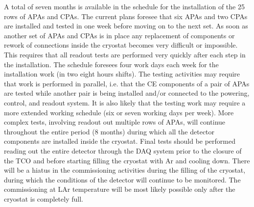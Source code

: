 A total of seven months is available in the schedule for the installation
of the 25 rows of APAs and CPAs. The current plans foresee that six APAs and two CPAs are installed and
tested in one week before moving on to the next set. As soon as another
set of APAs and CPAs is in place any replacement of components or rework
of connections inside the cryostat becomes very difficult or impossible.
This requires that all readout tests are performed very quickly after
each step in the installation. The schedule foresees four work days each
week for the installation work (in two eight hours shifts). The testing
activities may require that work is performed in parallel, i.e. that
the CE components of a pair of APAs are tested while another pair is
being installed and/or connected to the powering, control, and readout
system. It is also likely that the testing work may require a more
extended working schedule (six or seven working days per week). More
complex tests, involving readout out multiple rows of APAs, will continue
throughout the entire period (8 months) during which all the detector
components are installed inside the cryostat. Final tests should be
performed reading out the entire detector through the DAQ system
prior to the closure of the TCO and before starting filling the cryostat
with Ar and cooling down. There will be a hiatus in
the commissioning activities during the filling of the cryostat, during
which the conditions of the detector will continue to be monitored. The
commissioning at LAr temperature will be most likely possible only
after the cryostat is completely full.
